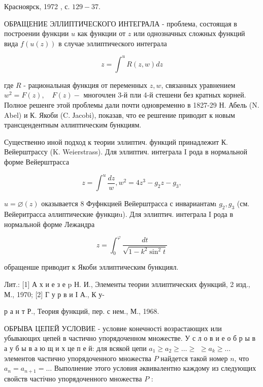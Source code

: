 \documentclass[10pt]{article}
\begin{document}
Красноярск, 1972 , с. $129-37$.



ОБРАЩЕНИЕ ЭЛЛИПТИЧЕСКОГО ИНТЕГРАЛА - проблема, состоящая в построении функции $u$ как функции от $z$ или однозначных сложных функций вида $f(u(z))$ в случае эллиптического интеграла



\[

z=\int^{u} R(z, w) d z

\]



где $R$ - рациональная функция от переменных $z, w$, связанных уравнением $w^{2}=F(z), \quad F(z)-$ многочлен 3-й пли 4-й стешени без кратных корней. Полное решенге этой проблемы дали почти одновременно в 1827-29 Н. Абель (N. Abel) и К. Якоби (C. Јacobi), показав, что ее решгение приводит к новым трансцендентным әллиптическим бункциям.



Существенно иной подход к теории эллиптич. функций принадлежит $К$. Вейерштрассу (K. Weierstrass). Для эллиптич. интеграла I рода в нормальной форме Вейерштрасса



\[

z=\int^{u} \frac{d z}{w}, w^{2}=4 z^{3}-g_{2} z-g_{3},

\]



$u=\varnothing(z)$ оказывается 8 Фуфнкцией Вейерштрасса с инвариантамı $g_{2}, g_{3}$ (см. Вейеритрасса әллиптические функциu). Для эллиптич. интеграла I рода в нормальной форме Лежандра



\[

z=\int_{0}^{\varphi} \frac{d t}{\sqrt{1-k^{2} \sin ^{2} t}}

\]



обращенше приводит к Якоби эллиптическим бункциял.



Лит.: [1] А х и е з е p Н. И., Элементы теории эллиптических функций, 2 изд., М., 1970; [2] Г у р в и І А., К у-

р а н т Р., Теория функций, пер. с нем., М., 1968.



ОБРЫВА ЦЕПЕЙ УСЛОВИЕ - условие конечності возрастающих или убывающих цепей в частично упорядоченном множестве. У с л о в и е о б р ы в а у б ы в а ю щ и х це п е й: для всякой цепи $a_{1} \geqslant a_{2} \geqslant \ldots \geqslant$ $\geqslant a_{k} \geqslant \ldots$ элементов частично упорядоченного множества $P$ найдется такой номер $n$, что $a_{n}=a_{n+1}=\ldots$ Выполнение этого условия әквивалентно каждому из следующих свойств частічно упорядоченного множества $P$ :
\end{document}
